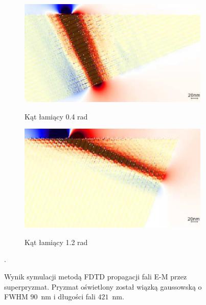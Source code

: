 \begin{figure}[btH]
	\centering
			\begin{subfigure}{0.45\textwidth}
				\includegraphics[width=\textwidth]{images/multilayer/prism04.png} \\
				\caption{Kąt łamiący 0.4 rad}
			\end{subfigure}
			\begin{subfigure}{0.45\textwidth}
				\includegraphics[width=\textwidth]{images/multilayer/prism12.png}\\
				\caption{Kąt łamiący 1.2 rad}
			\end{subfigure}
	\caption{Wynik symulacji metodą FDTD propagacji fali E-M przez superpryzmat. Pryzmat oświetlony został wiązką gaussowską o FWHM $90$~nm i długości fali $421$~nm.~\cite{prism2010}}.
\end{figure}

